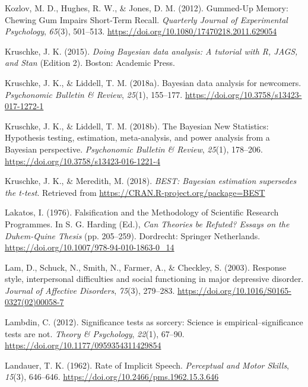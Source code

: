 \documentclass[a4paper,12pt,twoside,onecolumn,openright,final,oldfontcommands]{memoir}
\begin{document}
\leavevmode\hypertarget{ref-kozlov_gummed-up_2012}{}%
Kozlov, M. D., Hughes, R. W., \& Jones, D. M. (2012). Gummed-Up Memory: Chewing Gum Impairs Short-Term Recall. \emph{Quarterly Journal of Experimental Psychology}, \emph{65}(3), 501--513. \url{https://doi.org/10.1080/17470218.2011.629054}

\leavevmode\hypertarget{ref-kruschke_doing_2015}{}%
Kruschke, J. K. (2015). \emph{Doing Bayesian data analysis: A tutorial with R, JAGS, and Stan} (Edition 2). Boston: Academic Press.

\leavevmode\hypertarget{ref-kruschke_bayesian_2018}{}%
Kruschke, J. K., \& Liddell, T. M. (2018a). Bayesian data analysis for newcomers. \emph{Psychonomic Bulletin \& Review}, \emph{25}(1), 155--177. \url{https://doi.org/10.3758/s13423-017-1272-1}

\leavevmode\hypertarget{ref-kruschke_bayesian_2018-1}{}%
Kruschke, J. K., \& Liddell, T. M. (2018b). The Bayesian New Statistics: Hypothesis testing, estimation, meta-analysis, and power analysis from a Bayesian perspective. \emph{Psychonomic Bulletin \& Review}, \emph{25}(1), 178--206. \url{https://doi.org/10.3758/s13423-016-1221-4}

\leavevmode\hypertarget{ref-R-BEST}{}%
Kruschke, J. K., \& Meredith, M. (2018). \emph{BEST: Bayesian estimation supersedes the t-test}. Retrieved from \url{https://CRAN.R-project.org/package=BEST}

\leavevmode\hypertarget{ref-lakatos_falsification_1976}{}%
Lakatos, I. (1976). Falsification and the Methodology of Scientific Research Programmes. In S. G. Harding (Ed.), \emph{Can Theories be Refuted? Essays on the Duhem-Quine Thesis} (pp. 205--259). Dordrecht: Springer Netherlands. \url{https://doi.org/10.1007/978-94-010-1863-0_14}

\leavevmode\hypertarget{ref-lam_response_2003}{}%
Lam, D., Schuck, N., Smith, N., Farmer, A., \& Checkley, S. (2003). Response style, interpersonal difficulties and social functioning in major depressive disorder. \emph{Journal of Affective Disorders}, \emph{75}(3), 279--283. \url{https://doi.org/10.1016/S0165-0327(02)00058-7}

\leavevmode\hypertarget{ref-Lambdin2012}{}%
Lambdin, C. (2012). Significance tests as sorcery: Science is empirical--significance tests are not. \emph{Theory \& Psychology}, \emph{22}(1), 67--90. \url{https://doi.org/10.1177/0959354311429854}

\leavevmode\hypertarget{ref-landauer_rate_1962}{}%
Landauer, T. K. (1962). Rate of Implicit Speech. \emph{Perceptual and Motor Skills}, \emph{15}(3), 646--646. \url{https://doi.org/10.2466/pms.1962.15.3.646}
\end{document}
